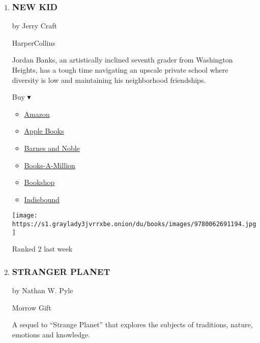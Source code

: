 \begin{enumerate}
\def\labelenumi{\arabic{enumi}.}
\item
  \hypertarget{new-kid}{%
  \subsubsection{NEW KID}\label{new-kid}}

  by Jerry Craft

  HarperCollins

  Jordan Banks, an artistically inclined seventh grader from Washington
  Heights, has a tough time navigating an upscale private school where
  diversity is low and maintaining his neighborhood friendships.

  Buy ▾

  \begin{itemize}
  \tightlist
  \item
    \href{https://www.amazon.com/New-Kid-Jerry-Craft/dp/0062691198?tag=NYTBS-20}{Amazon}
  \item
    \href{https://du-gae-books-dot-nyt-du-prd.appspot.com/buy?title=NEW+KID\&author=Jerry+Craft}{Apple
    Books}
  \item
    \href{https://www.anrdoezrs.net/click-7990613-11819508?url=https\%3A\%2F\%2Fwww.barnesandnoble.com\%2Fw\%2F\%3Fean\%3D9780062691194}{Barnes
    and Noble}
  \item
    \href{https://www.anrdoezrs.net/click-7990613-35140?url=https\%3A\%2F\%2Fwww.booksamillion.com\%2Fp\%2FNEW\%2BKID\%2FJerry\%2BCraft\%2F9780062691194}{Books-A-Million}
  \item
    \href{https://bookshop.org/a/3546/9780062691194}{Bookshop}
  \item
    \href{https://www.indiebound.org/book/9780062691194?aff=NYT}{Indiebound}
  \end{itemize}

  \texttt{[image: https://s1.graylady3jvrrxbe.onion/du/books/images/9780062691194.jpg]}

  Ranked 2 last week
\item
  \hypertarget{stranger-planet}{%
  \subsubsection{STRANGER PLANET}\label{stranger-planet}}

  by Nathan W. Pyle

  Morrow Gift

  A sequel to ``Strange Planet'' that explores the subjects of
  traditions, nature, emotions and knowledge.


\end{enumerate}
